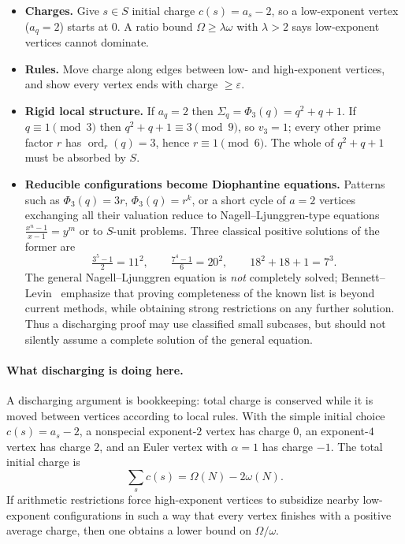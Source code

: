 \documentclass[11pt]{article}
\theoremstyle{definition}
\theoremstyle{remark}
\DeclareMathOperator{\ord}{ord}
\begin{document}
\begin{itemize}[leftmargin=1.5em]
\item \textbf{Charges.} Give $s\in S$ initial charge $c(s)=a_s-2$, so a
  low-exponent vertex ($a_q=2$) starts at $0$. A ratio bound
  $\Omega\ge\lambda\omega$ with $\lambda>2$ says low-exponent vertices
  cannot dominate.
\item \textbf{Rules.} Move charge along edges between low- and
  high-exponent vertices, and show every vertex ends with charge
  $\ge\varepsilon$.
\item \textbf{Rigid local structure.} If $a_q=2$ then
  $\Sigma_q=\Phi_3(q)=q^2+q+1$. If $q\equiv1\pmod3$ then
  $q^2+q+1\equiv3\pmod9$, so $v_3=1$; every other prime factor $r$ has
  $\ord_r(q)=3$, hence $r\equiv1\pmod 6$. The whole of $q^2+q+1$ must be
  absorbed by $S$.
\item \textbf{Reducible configurations become Diophantine equations.}
  Patterns such as $\Phi_3(q)=3r$, $\Phi_3(q)=r^k$, or a short cycle of
  $a=2$ vertices exchanging all their valuation reduce to
  Nagell--Ljunggren-type equations $\frac{x^n-1}{x-1}=y^m$ or to
  $S$-unit problems.  Three classical positive solutions of the former are
  \[
  \tfrac{3^5-1}{2}=11^2,\qquad \tfrac{7^4-1}{6}=20^2,\qquad
  18^2+18+1=7^3.
  \]
  The general Nagell--Ljunggren equation is \emph{not} completely solved;
  Bennett--Levin~\cite{BennettLevin} emphasize that proving completeness of
  the known list is beyond current methods, while obtaining strong
  restrictions on any further solution.  Thus a discharging proof may use
  classified small subcases, but should not silently assume a complete
  solution of the general equation.
\end{itemize}

\paragraph{What discharging is doing here.}
A discharging argument is bookkeeping: total charge is conserved while it is
moved between vertices according to local rules.  With the simple initial
choice $c(s)=a_s-2$, a nonspecial exponent-$2$ vertex has charge $0$, an
exponent-$4$ vertex has charge $2$, and an Euler vertex with $\alpha=1$ has
charge $-1$.  The total initial charge is
\[
\sum_s c(s)=\Omega(N)-2\omega(N).
\]
If arithmetic restrictions force high-exponent vertices to subsidize nearby
low-exponent configurations in such a way that every vertex finishes with a
positive average charge, then one obtains a lower bound on
$\Omega/\omega$.
\end{document}
